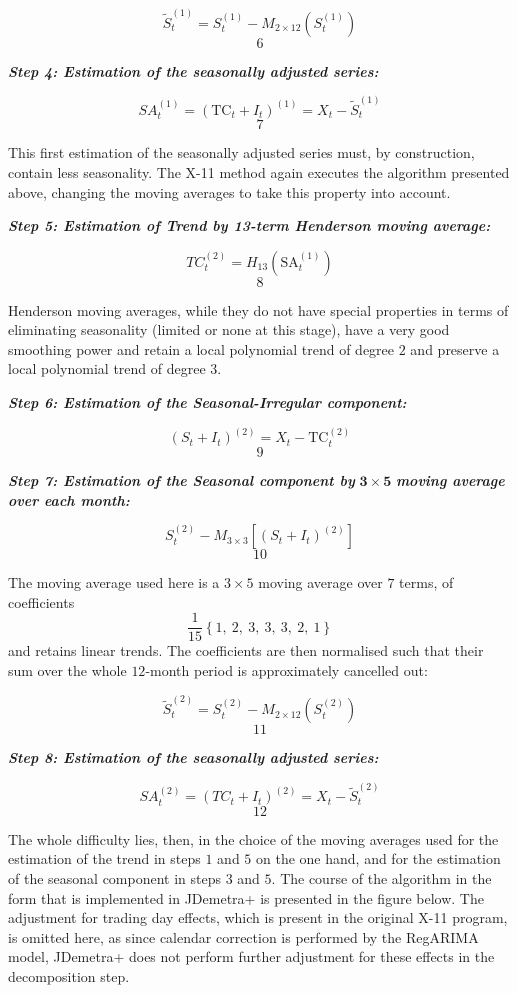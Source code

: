 \documentclass[
]{book}
\begin{document}
\[
   \widetilde{S}_{t}^{(1)} = S_{t}^{(1)} - M_{2 \times 12}\left( S_{t}^{(1)} \right)
  \] \[6\]

\textbf{\emph{Step 4: Estimation of the seasonally adjusted series:}}

\[
  SA_{t}^{\left( 1 \right)} = \left( \text{TC}_{t} + I_{t} \right)^{(1)} = X_{t} - {\widetilde{S}}_{t}^{(1)}
  \] \[7\]

This first estimation of the seasonally adjusted series must, by
construction, contain less seasonality. The X-11 method again executes
the algorithm presented above, changing the moving averages to take this
property into account.

\textbf{\emph{Step 5: Estimation of Trend by 13-term Henderson moving average:}}

\[
  TC_{t}^{(2)} = H_{13}\left( \text{SA}_{t}^{\left( 1 \right)} \right)
  \] \[8\]

Henderson moving averages, while they do not have special properties in
terms of eliminating seasonality (limited or none at this stage), have a
very good smoothing power and retain a local polynomial trend of degree
\(2\) and preserve a local polynomial trend of degree \(3\).

\textbf{\emph{Step 6: Estimation of the Seasonal-Irregular component:}}

\[
  \left( S_{t} + I_{t} \right)^{(2)} = X_{t} - \text{TC}_{t}^{(2)}
  \] \[9\]

\textbf{\emph{Step 7: Estimation of the Seasonal component by}} \(\mathbf{3 \times 5}\)
\textbf{\emph{moving average over each month:}}

\[S_{t}^{(2)} - M_{3 \times 3}\left\lbrack \left( S_{t} + I_{t} \right)^{(2)} \right\rbrack\] \[10\]

The moving average used here is a \(3 \times 5\) moving average over \(7\)
terms, of coefficients
\[\frac{1}{15} \left\{ 1,\ 2,\ 3,\ 3,\ 3,\ 2,\ 1 \right\}\] and retains
linear trends. The coefficients are then normalised such that their sum
over the whole \(12\)-month period is approximately cancelled out:

\[{ \widetilde{S}}_{t}^{(2)} = S_{t}^{(2)} - M_{2 \times 12}\left( S_{t}^{(2)} \right)\] \[11\]

\textbf{\emph{Step 8: Estimation of the seasonally adjusted series:}}

\[SA_{t}^{\left( 2 \right)} = \left(TC_{t} + I_{t} \right)^{(2)} = X_{t} - {\widetilde{S}}_{t}^{(2)}\] \[12\]

The whole difficulty lies, then, in the choice of the moving averages
used for the estimation of the trend in steps \(1\) and \(5\) on the one
hand, and for the estimation of the seasonal component in steps \(3\) and
\(5\). The course of the algorithm in the form that is implemented in
JDemetra+ is presented in the figure below. The adjustment for trading day
effects, which is present in the original X-11 program, is omitted here,
as since calendar correction is performed by the RegARIMA model,
JDemetra+ does not perform further adjustment for these effects in the
decomposition step.
\end{document}
